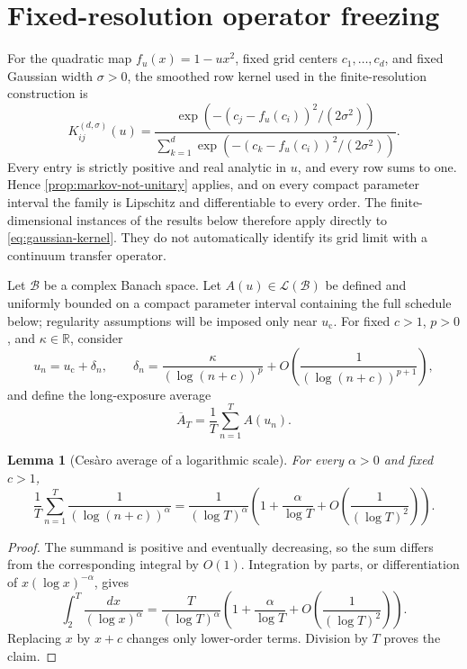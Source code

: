 \documentclass[11pt]{article}
\newtheorem{lemma}[theorem]{Lemma}
\theoremstyle{definition}
\theoremstyle{remark}
\newcommand{\R}{\mathbb R}
\newcommand{\uc}{u_{\mathrm c}}
\newcommand{\cB}{\mathcal B}
\newcommand{\cL}{\mathcal L}
\begin{document}
\section{Fixed-resolution operator freezing}\label{sec:freezing}

For the quadratic map $f_u(x)=1-u x^2$, fixed grid centers $c_1,\ldots,c_d$, and fixed Gaussian width $\sigma>0$, the smoothed row kernel used in the finite-resolution construction is
\begin{equation}\label{eq:gaussian-kernel}
    K_{ij}^{(d,\sigma)}(u)
    =\frac{\exp\left(-(c_j-f_u(c_i))^2/(2\sigma^2)\right)}
    {\sum_{k=1}^d\exp\left(-(c_k-f_u(c_i))^2/(2\sigma^2)\right)}.
\end{equation}
Every entry is strictly positive and real analytic in $u$, and every row sums to one.  Hence \cref{prop:markov-not-unitary} applies, and on every compact parameter interval the family is Lipschitz and differentiable to every order.  The finite-dimensional instances of the results below therefore apply directly to \eqref{eq:gaussian-kernel}.  They do not automatically identify its grid limit with a continuum transfer operator.

Let $\cB$ be a complex Banach space.  Let $A(u)\in\cL(\cB)$ be defined and uniformly bounded on a compact parameter interval containing the full schedule below; regularity assumptions will be imposed only near $\uc$.  For fixed $c>1$, $p>0$, and $\kappa\in\R$, consider
\begin{equation}\label{eq:log-schedule}
    u_n=\uc+\delta_n,
    \qquad
    \delta_n=\frac{\kappa}{(\log(n+c))^p}
    +O\left(\frac1{(\log(n+c))^{p+1}}\right),
\end{equation}
and define the long-exposure average
\begin{equation}\label{eq:operator-average}
    \overline A_T=\frac1T\sum_{n=1}^T A(u_n).
\end{equation}

\begin{lemma}[Ces\`aro average of a logarithmic scale]\label{lem:slow-average}
For every $\alpha>0$ and fixed $c>1$,
\begin{equation}\label{eq:slow-average}
    \frac1T\sum_{n=1}^T\frac1{(\log(n+c))^\alpha}
    =\frac1{(\log T)^\alpha}
      \left(1+\frac{\alpha}{\log T}
      +O\left(\frac1{(\log T)^2}\right)\right).
\end{equation}
\end{lemma}

\begin{proof}
The summand is positive and eventually decreasing, so the sum differs from the corresponding integral by $O(1)$.  Integration by parts, or differentiation of $x(\log x)^{-\alpha}$, gives
\[
    \int_2^T\frac{dx}{(\log x)^\alpha}
    =\frac{T}{(\log T)^\alpha}
      \left(1+\frac{\alpha}{\log T}
      +O\left(\frac1{(\log T)^2}\right)\right).
\]
Replacing $x$ by $x+c$ changes only lower-order terms.  Division by $T$ proves the claim.
\end{proof}
\end{document}
